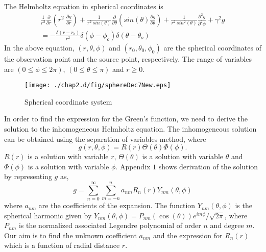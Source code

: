 The Helmholtz equation in  spherical coordinates \cite{balanis1989advanced,weisstein2005delta,wiki:delta} is
\begin{equation}
\label{sec2.3/1}
\begin{split}
  \frac{1}{r^2}\frac{\partial}{\partial{r}}(r^2~\frac{\partial{g}}{\partial{r}})+\frac{1}{r^2~sin(\theta)}\frac{\partial}{\partial{\theta}}(sin(\theta)\frac{\partial{g}}{\partial{\theta}})+\frac{1}{r^2~sin^2(\theta)}\frac{\partial^2{g}}{\partial^2{\phi}}+\gamma^2g \\
=- \frac{\delta (r-r_o)}{r^2} \delta (\phi-\phi_o)\delta(\theta-\theta_o)
\end{split}
\end{equation}
In the above equation, $(r,\theta,\phi)$ and $(r_0,\theta_0,\phi_0)$  are the spherical coordinates of the observation point and the source point, respectively. The range of variables  are $( 0 \le \phi \le 2\pi)$,  $ (0 \le \theta \le \pi)$ and $r \ge 0$. 
\begin{figure}[h!]
\begin{center}
\texttt{[image: ./chap2.d/fig/sphereDec7New.eps]}
\caption{Spherical coordinate system}
\label{sphericalCoSy}
\end{center}
\end {figure}
\par
 In order to find the expression for  the Green's function,  we need to derive the  solution to the inhomogeneous Helmholtz equation. The inhomogeneous solution can be obtained using the separation of variables method, where
\begin{equation}
\label{sec2.3/2}
 g(r,\theta,\phi) = R(r) {\Theta}(\theta){\Phi}(\phi).
\end{equation}
 $R(r)$ is a  solution with variable $r$, $\Theta(\theta)$ is a solution with variable $\theta$ and  $\Phi(\phi)$ is a solution with variable $\phi$.
Appendix $1$  shows derivation of the solution by representing $g$ as,
\begin{equation}
\label{sec2.3/3}
g = \sum_{n=0}^{\infty} \sum_{m=-n}^{n}
a_{nm} R_n(r) Y_{nm}(\theta, \phi)
\end{equation}
where  $a_{nm}$ are  the coefficients of the expansion. The function  $Y_{nm}(\theta,\phi)$ is the spherical harmonic  given by  
 $Y_{nm}(\theta, \phi ) = P_{nm}(\cos( \theta)) e^{im\phi}/\sqrt{2\pi}$,
where  $P_{nm}$ is the  normalized 
associated Legendre polynomial of order  $n$ and degree $m$. Our aim is to find the unknown coefficient $a_{nm}$ and the expression for $R_n(r)$ which is a function of radial distance $r$.
